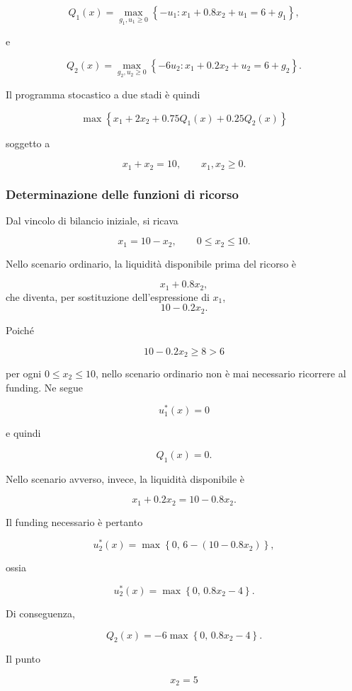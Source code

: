\begin{example}
\[
Q_1(x)
=
\max_{g_1,u_1\geq0}
\left\{
-u_1:
x_1+0.8x_2+u_1=6+g_1
\right\},
\]

\noindent e

\[
Q_2(x)
=
\max_{g_2,u_2\geq0}
\left\{
-6u_2:
x_1+0.2x_2+u_2=6+g_2
\right\}.
\]

Il programma stocastico a due stadi \`e quindi

\[
\max
\left\{
x_1+2x_2
+
0.75Q_1(x)
+
0.25Q_2(x)
\right\}
\]

\noindent soggetto a

\[
x_1+x_2=10,
\qquad
x_1,x_2\geq0.
\]

\end{example}

\subsubsection{Determinazione delle funzioni di ricorso}

Dal vincolo di bilancio iniziale, si ricava

\[
x_1=10-x_2,
\qquad
0\leq x_2\leq10.
\]

Nello scenario ordinario, la liquidit\`a disponibile prima del ricorso
\`e

\[
x_1+0.8x_2,
\]
\noindent che diventa, per sostituzione dell'espressione di $x_1$,
\[
10-0.2x_2.
\]

Poich\'e

\[
10-0.2x_2\geq8>6
\]

\noindent per ogni $0\leq x_2\leq10$, nello scenario ordinario non \`e mai
necessario ricorrere al funding. Ne segue

\[
u_1^*(x)=0
\]

\noindent e quindi

\[
Q_1(x)=0.
\]

Nello scenario avverso, invece, la liquidit\`a disponibile \`e

\[
x_1+0.2x_2
=
10-0.8x_2.
\]

Il funding necessario \`e pertanto

\[
u_2^*(x)
=
\max
\left\{
0,\,
6-(10-0.8x_2)
\right\},
\]

\noindent ossia

\[
u_2^*(x)
=
\max
\left\{
0,\,
0.8x_2-4
\right\}.
\]

Di conseguenza,

\[
Q_2(x)
=
-6
\max
\left\{
0,\,
0.8x_2-4
\right\}.
\]

Il punto

\[
x_2=5
\]

